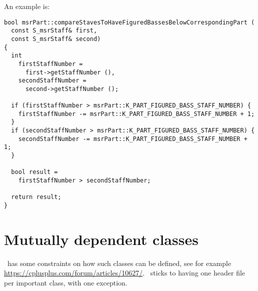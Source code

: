 An example is:
\begin{lstlisting}[language=Terminal]
bool msrPart::compareStavesToHaveFiguredBassesBelowCorrespondingPart (
  const S_msrStaff& first,
  const S_msrStaff& second)
{
  int
    firstStaffNumber =
      first->getStaffNumber (),
    secondStaffNumber =
      second->getStaffNumber ();

  if (firstStaffNumber > msrPart::K_PART_FIGURED_BASS_STAFF_NUMBER) {
    firstStaffNumber -= msrPart::K_PART_FIGURED_BASS_STAFF_NUMBER + 1;
  }
  if (secondStaffNumber > msrPart::K_PART_FIGURED_BASS_STAFF_NUMBER) {
    secondStaffNumber -= msrPart::K_PART_FIGURED_BASS_STAFF_NUMBER + 1;
  }

  bool result =
    firstStaffNumber > secondStaffNumber;

  return result;
}
\end{lstlisting}


\section{Mutually dependent classes}

\CPlusplus\ has some constraints on how such classes can be defined, see for example \url{https://cplusplus.com/forum/articles/10627/}. \mf\ sticks to having one header file per important class, with one exception.


%
%


